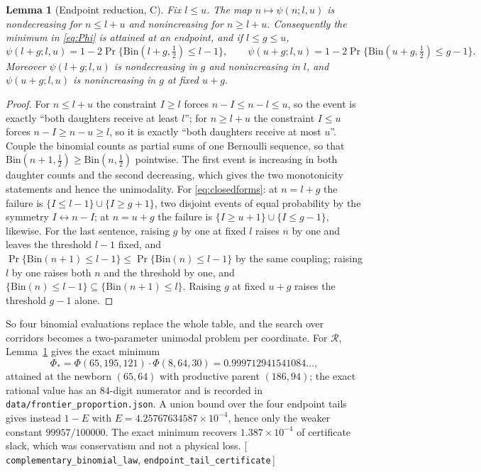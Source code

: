 \documentclass[11pt]{article}
\theoremstyle{plain}
\newtheorem{lemma}[theorem]{Lemma}
\theoremstyle{definition}
\theoremstyle{remark}
\newcommand{\Bin}{\mathrm{Bin}}
\newcommand{\leanref}[1]{{\normalfont\sffamily\footnotesize[\,#1\,]}}
\begin{document}
\begin{lemma}[Endpoint reduction, C]\label{lem:endpoint}
Fix $l\le u$. The map $n\mapsto\psi(n;l,u)$ is nondecreasing for $n\le l+u$
and nonincreasing for $n\ge l+u$. Consequently the minimum in \eqref{eq:Phi}
is attained at an endpoint, and if $l\le g\le u$,
\begin{equation}\label{eq:closedforms}
\psi(l+g;l,u)=1-2\Pr\{\Bin(l+g,\tfrac12)\le l-1\},\qquad
\psi(u+g;l,u)=1-2\Pr\{\Bin(u+g,\tfrac12)\le g-1\}.
\end{equation}
Moreover $\psi(l+g;l,u)$ is nondecreasing in $g$ and nonincreasing in $l$,
and $\psi(u+g;l,u)$ is nonincreasing in $g$ at fixed $u+g$.
\end{lemma}

\begin{proof}
For $n\le l+u$ the constraint $I\ge l$ forces $n-I\le n-l\le u$, so the event
is exactly ``both daughters receive at least $l$''; for $n\ge l+u$ the
constraint $I\le u$ forces $n-I\ge n-u\ge l$, so it is exactly ``both
daughters receive at most $u$''. Couple the binomial counts as partial sums of
one Bernoulli sequence, so that $\Bin(n+1,\frac12)\ge\Bin(n,\frac12)$
pointwise. The first event is increasing in both daughter counts and the
second decreasing, which gives the two monotonicity statements and hence the
unimodality. For \eqref{eq:closedforms}: at $n=l+g$ the failure is
$\{I\le l-1\}\cup\{I\ge g+1\}$, two disjoint events of equal probability by
the symmetry $I\leftrightarrow n-I$; at $n=u+g$ the failure is
$\{I\ge u+1\}\cup\{I\le g-1\}$, likewise. For the last sentence, raising $g$
by one at fixed $l$ raises $n$ by one and leaves the threshold $l-1$ fixed,
and $\Pr\{\Bin(n+1)\le l-1\}\le\Pr\{\Bin(n)\le l-1\}$ by the same coupling;
raising $l$ by one raises both $n$ and the threshold by one, and
$\{\Bin(n)\le l-1\}\subseteq\{\Bin(n+1)\le l\}$. Raising $g$ at fixed $u+g$
raises the threshold $g-1$ alone. \end{proof}

So four binomial evaluations replace the whole table, and the search over
corridors becomes a two-parameter unimodal problem per coordinate. For $\mathcal{R}$, Lemma~\ref{lem:endpoint} gives the exact minimum
\begin{equation}\label{eq:Phistar}
\Phi_*=\Phi(65,195,121)\cdot\Phi(8,64,30)=0.999712941541084\ldots,
\end{equation}
attained at the newborn $(65,64)$ with productive parent $(186,94)$; the exact
rational value has an $84$-digit numerator and is recorded in
\texttt{data/frontier\_proportion.json}. A union bound over the four
endpoint tails gives instead $1-E$ with $E=4.25767634587\times10^{-4}$, hence
only the weaker constant $99957/100000$. The exact minimum recovers
$1.387\times10^{-4}$ of certificate slack, which was conservatism and not a
physical loss.
\leanref{\texttt{complementary\_binomial\_law},
\texttt{endpoint\_tail\_certificate}}
\end{document}
